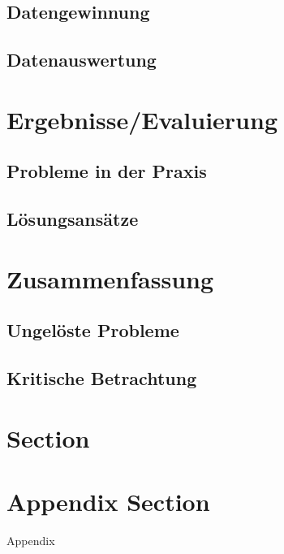 \documentclass[a4paper, 12pt]{article}
\begin{document}
\subsection{Datengewinnung}
\subsection{Datenauswertung}
 

\section{Ergebnisse/Evaluierung}
\subsection{Probleme in der Praxis}
\subsection{Lösungsansätze}


\section{Zusammenfassung}
\subsection{Ungelöste Probleme}
\subsection{Kritische Betrachtung}


\section{Section}
\cite{OpenPNovo}
\cite{pNovoPlus}

\begingroup
\setlength{\emergencystretch}{.5em}
\printbibliography
\endgroup

\appendix
\section{Appendix Section}
Appendix
\end{document}
